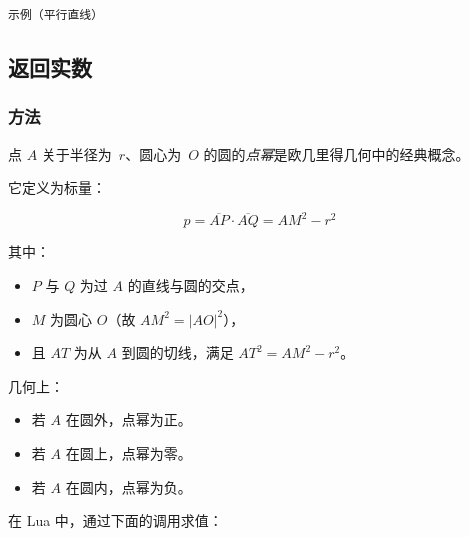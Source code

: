 \texttt{示例（平行直线）}

\begin{tkzexample}[latex=.48\textwidth]
\end{tkzexample}


\subsection{返回实数}

\subsubsection{方法 }
\label{ssub:method_circle_power_pt}

点 $A$ 关于半径为~$r$、圆心为~$O$ 的圆的\emph{点幂}是欧几里得几何中的经典概念。

\medskip

它定义为标量：

\[
p = \overline{AP} \cdot \overline{AQ} = AM^2 - r^2
\]

其中：
\begin{itemize}
  \item $P$ 与 $Q$ 为过 $A$ 的直线与圆的交点，
  \item $M$ 为圆心 $O$（故 $AM^2 = |AO|^2$），
  \item 且 $AT$ 为从 $A$ 到圆的切线，满足 $AT^2 = AM^2 - r^2$。
\end{itemize}


几何上：
\begin{itemize}
  \item 若 $A$ 在圆外，点幂为正。
  \item 若 $A$ 在圆上，点幂为零。
  \item 若 $A$ 在圆内，点幂为负。
\end{itemize}

\medskip

在 Lua 中，通过下面的调用求值：

\begin{center}
\end{center}


